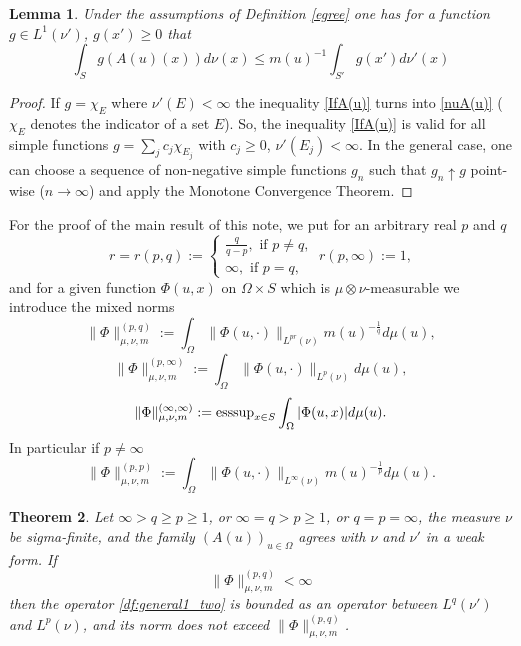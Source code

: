 \documentclass[12pt,reqno]{amsart}
\newtheorem{theorem}{Theorem}
\newtheorem{lemma}[theorem]{Lemma}
\begin{document}
\begin{lemma}\label{lm:IfA(u)}
Under the assumptions of  Definition \ref{egree} one has  for a function  $g\in L^1(\nu')$, $g(x')\ge 0$  that
\begin{equation}\label{IfA(u)}
\int_{S}g(A(u)(x))d\nu(x)\le m(u)^{-1}\int_{S'}g(x')d\nu'(x)
\end{equation}
\end{lemma}
\begin{proof}
If $g=\chi_{E}$ where $\nu'(E)<\infty$ the inequality \eqref{IfA(u)} turns into \eqref{nuA(u)}  ($\chi_{E}$ denotes the indicator of a  set $E$). So,    the inequality \eqref{IfA(u)} is valid for all simple functions $g=\sum_j c_j\chi_{E_j}$ with $c_j\ge 0$, $\nu'(E_j)<\infty$. In the general case, one can choose a sequence of non-negative simple functions $g_n$ such that $g_n\uparrow g$  point-wise ($n\to\infty$) and apply the Monotone Convergence Theorem.
\end{proof}


For the proof of the main result of this note, we put for an arbitrary real $p$ and $q$
\begin{equation}\label{r}
r=r(p,q):=
\begin{cases}
\frac{q}{q-p}, \mbox{ if } p\ne q,\\
\infty, \mbox{ if } p=q,
\end{cases} \ r(p,\infty):=1,
\end{equation}
and for  a given  function $\Phi(u,x)$ on $\Omega\times S$ which is $\mu\otimes\nu$-measurable we introduce the mixed norms
$$
\|\Phi\|_{\mu,\nu,m}^{(p,q)}:=\int_\Omega\|\Phi(u,\cdot)\|_{L^{pr}(\nu)}m(u)^{-\frac 1q}d\mu(u),
$$
$$
\|\Phi\|_{\mu,\nu,m}^{(p,\infty)}:=\int_\Omega\|\Phi(u,\cdot)\|_{L^{p}(\nu)}d\mu(u),
$$
$$
\|\Phi\|_{\mu,\nu,m}^{(\infty,\infty)}:={\rm esssup}_{x\in S}\int_\Omega |\Phi(u,x)|d\mu(u).
$$
In particular if $p\ne \infty$
$$
\|\Phi\|_{\mu,\nu,m}^{(p,p)}:=\int_\Omega \|\Phi(u,\cdot)\|_{L^{\infty}(\nu)}m(u)^{-\frac 1p}d\mu(u).
$$

\begin{theorem}\label{th:bdd_Lqp_two} Let $\infty>q\ge p\ge 1$,  or  $\infty=q> p\ge 1$, or $q=p= \infty$, the measure $\nu$ be   sigma-finite, and the family $(A(u))_{u\in \Omega}$ agrees with $\nu$ and $\nu'$  in a weak form.
If
\begin{equation}\label{Phi_qp}
 \|\Phi\|_{\mu,\nu,m}^{(p,q)}<\infty
\end{equation}
then the operator \eqref{df:general1_two}
 is bounded as an operator between $L^q(\nu')$ and  $L^p(\nu)$, and its norm does not exceed $\|\Phi\|_{\mu,\nu,m}^{(p,q)}$.
\end{theorem}
\end{document}

